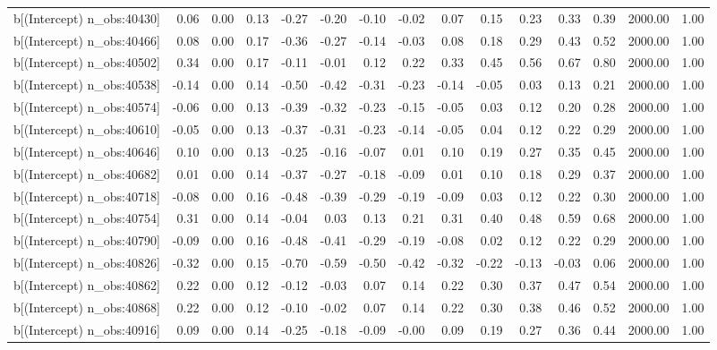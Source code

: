 \begin{table}[ht]
\begin{tabular}{rrrrrrrrrrrrrrr}
  b[(Intercept) n\_obs:40430] & 0.06 & 0.00 & 0.13 & -0.27 & -0.20 & -0.10 & -0.02 & 0.07 & 0.15 & 0.23 & 0.33 & 0.39 & 2000.00 & 1.00 \\ 
  b[(Intercept) n\_obs:40466] & 0.08 & 0.00 & 0.17 & -0.36 & -0.27 & -0.14 & -0.03 & 0.08 & 0.18 & 0.29 & 0.43 & 0.52 & 2000.00 & 1.00 \\ 
  b[(Intercept) n\_obs:40502] & 0.34 & 0.00 & 0.17 & -0.11 & -0.01 & 0.12 & 0.22 & 0.33 & 0.45 & 0.56 & 0.67 & 0.80 & 2000.00 & 1.00 \\ 
  b[(Intercept) n\_obs:40538] & -0.14 & 0.00 & 0.14 & -0.50 & -0.42 & -0.31 & -0.23 & -0.14 & -0.05 & 0.03 & 0.13 & 0.21 & 2000.00 & 1.00 \\ 
  b[(Intercept) n\_obs:40574] & -0.06 & 0.00 & 0.13 & -0.39 & -0.32 & -0.23 & -0.15 & -0.05 & 0.03 & 0.12 & 0.20 & 0.28 & 2000.00 & 1.00 \\ 
  b[(Intercept) n\_obs:40610] & -0.05 & 0.00 & 0.13 & -0.37 & -0.31 & -0.23 & -0.14 & -0.05 & 0.04 & 0.12 & 0.22 & 0.29 & 2000.00 & 1.00 \\ 
  b[(Intercept) n\_obs:40646] & 0.10 & 0.00 & 0.13 & -0.25 & -0.16 & -0.07 & 0.01 & 0.10 & 0.19 & 0.27 & 0.35 & 0.45 & 2000.00 & 1.00 \\ 
  b[(Intercept) n\_obs:40682] & 0.01 & 0.00 & 0.14 & -0.37 & -0.27 & -0.18 & -0.09 & 0.01 & 0.10 & 0.18 & 0.29 & 0.37 & 2000.00 & 1.00 \\ 
  b[(Intercept) n\_obs:40718] & -0.08 & 0.00 & 0.16 & -0.48 & -0.39 & -0.29 & -0.19 & -0.09 & 0.03 & 0.12 & 0.22 & 0.30 & 2000.00 & 1.00 \\ 
  b[(Intercept) n\_obs:40754] & 0.31 & 0.00 & 0.14 & -0.04 & 0.03 & 0.13 & 0.21 & 0.31 & 0.40 & 0.48 & 0.59 & 0.68 & 2000.00 & 1.00 \\ 
  b[(Intercept) n\_obs:40790] & -0.09 & 0.00 & 0.16 & -0.48 & -0.41 & -0.29 & -0.19 & -0.08 & 0.02 & 0.12 & 0.22 & 0.29 & 2000.00 & 1.00 \\ 
  b[(Intercept) n\_obs:40826] & -0.32 & 0.00 & 0.15 & -0.70 & -0.59 & -0.50 & -0.42 & -0.32 & -0.22 & -0.13 & -0.03 & 0.06 & 2000.00 & 1.00 \\ 
  b[(Intercept) n\_obs:40862] & 0.22 & 0.00 & 0.12 & -0.12 & -0.03 & 0.07 & 0.14 & 0.22 & 0.30 & 0.37 & 0.47 & 0.54 & 2000.00 & 1.00 \\ 
  b[(Intercept) n\_obs:40868] & 0.22 & 0.00 & 0.12 & -0.10 & -0.02 & 0.07 & 0.14 & 0.22 & 0.30 & 0.38 & 0.46 & 0.52 & 2000.00 & 1.00 \\ 
  b[(Intercept) n\_obs:40916] & 0.09 & 0.00 & 0.14 & -0.25 & -0.18 & -0.09 & -0.00 & 0.09 & 0.19 & 0.27 & 0.36 & 0.44 & 2000.00 & 1.00 \\ 

\end{tabular}
\end{table}

